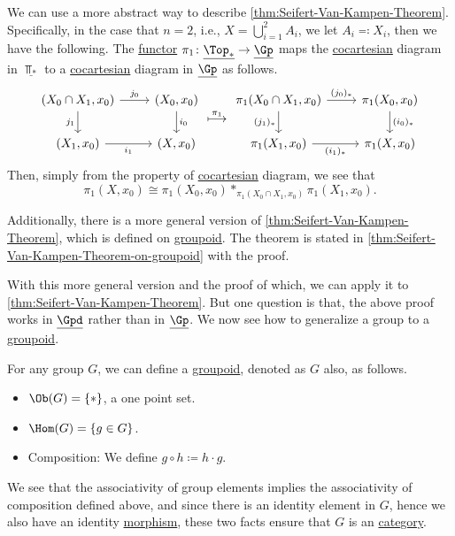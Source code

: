 \begin{remark}
	We can use a more abstract way to describe \autoref{thm:Seifert-Van-Kampen-Theorem}. Specifically, in the case that \(n = 2\), i.e., \(X = \bigcup_{i=1}^{2} A_{i} \),
	we let \(A_{i} \eqqcolon X_{i} \), then we have the following. The \hyperref[def:functor]{functor} \(\pi _1\colon \underline{\Top_{\ast}}\to \underline{\Gp}\)
	maps the \hyperref[def:cocartesian]{cocartesian} diagram in \(\underline{\Top _\ast}\) to a \hyperref[def:cocartesian]{cocartesian} diagram in \(\underline{\Gp }\)
	as follows.
	\[
		\begin{tikzcd}
			{(X_0\cap X_1, x_0)} & {(X_0, x_0)} \\
			{(X_1, x_0)} & {(X, x_0)}
			\arrow["{j_0}", from=1-1, to=1-2]
			\arrow["{i_0}", from=1-2, to=2-2]
			\arrow["{i_1}"', from=2-1, to=2-2]
			\arrow["{j_1}"', from=1-1, to=2-1]
		\end{tikzcd}\overset{\pi _1}{\longmapsto}
		\begin{tikzcd}
			{\pi_1(X_0\cap X_1, x_0)} & {\pi_1(X_0, x_0)} \\
			{\pi_1(X_1, x_0)} & {\pi_1(X, x_0)}
			\arrow["{(j_0)_\ast}", from=1-1, to=1-2]
			\arrow["{(i_0)_\ast}", from=1-2, to=2-2]
			\arrow["{(i_1)_\ast}"', from=2-1, to=2-2]
			\arrow["{(j_1)_\ast}"', from=1-1, to=2-1]
		\end{tikzcd} \]
	Then, simply from the property of \hyperref[def:cocartesian]{cocartesian} diagram, we see that
	\[
		\pi _1(X, x_0)\cong \pi _1(X_0, x_0)\ast_{\pi _1(X_0 \cap X_1, x_0)}\pi _1(X_1, x_0).
	\]
\end{remark}

Additionally, there is a more general version of \autoref{thm:Seifert-Van-Kampen-Theorem}, which is defined on \hyperref[def:groupoid]{groupoid}. The theorem is
stated in \autoref{thm:Seifert-Van-Kampen-Theorem-on-groupoid} with the proof.

With this more general version and the proof of which, we can apply it to \autoref{thm:Seifert-Van-Kampen-Theorem}. But one question is that, the above proof
works in \(\underline{\Gpd}\) rather than in \(\underline{\Gp}\). We now see how to generalize a group to a \hyperref[def:groupoid]{groupoid}.

For any group \(G\), we can define a \hyperref[def:groupoid]{groupoid}, denoted as \(G\) also, as follows.
\begin{itemize}
	\item \(\Ob (G) = \{\ast \}\), a one point set.
	\item \(\Hom (G) = \{g\in G\}\).
	\item Composition: We define \(g\circ h \coloneqq h\cdot g\).
\end{itemize}
We see that the associativity of group elements implies the associativity of composition defined above, and since there is an identity element in \(G\), hence we also have
an identity \hyperref[def:morphism]{morphism}, these two facts ensure that \(G\) is an \hyperref[def:category]{category}.

